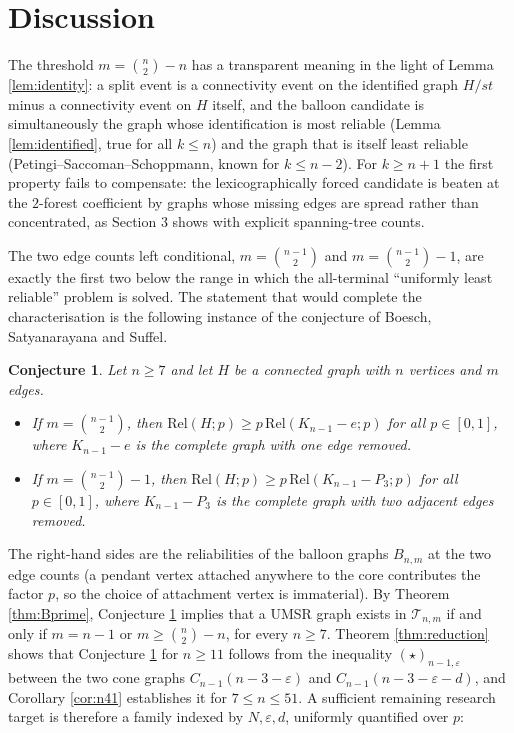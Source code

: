 \documentclass[
  11pt,
]{article}
\newtheorem{conjecture}[theorem]{Conjecture}
\theoremstyle{definition}
\theoremstyle{remark}
\begin{document}
\section{Discussion}\label{discussion}

The threshold \(m=\binom n2-n\) has a transparent meaning in the light
of Lemma \ref{lem:identity}: a split event is a connectivity event on
the identified graph \(H/st\) minus a connectivity event on \(H\)
itself, and the balloon candidate is simultaneously the graph whose
identification is most reliable (Lemma \ref{lem:identified}, true for
all \(k\le n\)) and the graph that is itself least reliable
(Petingi--Saccoman--Schoppmann, known for \(k\le n-2\)). For
\(k\ge n+1\) the first property fails to compensate: the
lexicographically forced candidate is beaten at the \(2\)-forest
coefficient by graphs whose missing edges are spread rather than
concentrated, as Section 3 shows with explicit spanning-tree counts.

The two edge counts left conditional, \(m=\binom{n-1}2\) and
\(m=\binom{n-1}2-1\), are exactly the first two below the range in which
the all-terminal ``uniformly least reliable'' problem is solved. The
statement that would complete the characterisation is the following
instance of the conjecture of Boesch, Satyanarayana and Suffel.

\begin{conjecture}\label{conj:boundary}
Let $n\ge 7$ and let $H$ be a connected graph with $n$ vertices and $m$ edges.
\begin{itemize}
\item[(a)] If $m=\binom{n-1}2$, then $\mathrm{Rel}(H;p)\ge p\,\mathrm{Rel}(K_{n-1}-e;p)$ for all $p\in[0,1]$, where $K_{n-1}-e$ is the complete graph with one edge removed.
\item[(b)] If $m=\binom{n-1}2-1$, then $\mathrm{Rel}(H;p)\ge p\,\mathrm{Rel}(K_{n-1}-P_3;p)$ for all $p\in[0,1]$, where $K_{n-1}-P_3$ is the complete graph with two adjacent edges removed.
\end{itemize}
\end{conjecture}

The right-hand sides are the reliabilities of the balloon graphs
\(B_{n,m}\) at the two edge counts (a pendant vertex attached anywhere
to the core contributes the factor \(p\), so the choice of attachment
vertex is immaterial). By Theorem \ref{thm:Bprime}, Conjecture
\ref{conj:boundary} implies that a UMSR graph exists in
\(\mathcal T_{n,m}\) if and only if \(m=n-1\) or \(m\ge\binom n2-n\),
for every \(n\ge 7\). Theorem \ref{thm:reduction} shows that Conjecture
\ref{conj:boundary} for \(n\ge11\) follows from the inequality
\((\star)_{n-1,\varepsilon}\) between the two cone graphs
\(C_{n-1}(n-3-\varepsilon)\) and \(C_{n-1}(n-3-\varepsilon-d)\), and
Corollary \ref{cor:n41} establishes it for \(7\le n\le 51\). A
sufficient remaining research target is therefore a family indexed by
\(N,\varepsilon,d\), uniformly quantified over \(p\):
\end{document}
